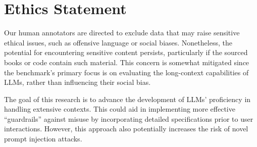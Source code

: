 \section*{Ethics Statement}
Our human annotators are directed to exclude data that may raise sensitive ethical issues, such as offensive language or social biases. Nonetheless, the potential for encountering sensitive content persists, particularly if the sourced books or code contain such material. This concern is somewhat mitigated since the benchmark's primary focus is on evaluating the long-context capabilities of LLMs, rather than influencing their social bias.

The goal of this research is to advance the development of LLMs' proficiency in handling extensive contexts. This could aid in implementing more effective ``guardrails'' against misuse by incorporating detailed specifications prior to user interactions. However, this approach also potentially increases the risk of novel prompt injection attacks.

\newpage

